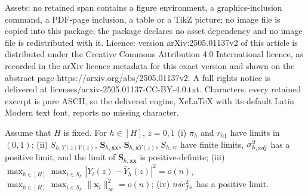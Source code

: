 \documentclass[10pt,a4paper]{amsart}
\newcommand{\adj}{\textnormal{adj}}
\newcommand{\bs}{\boldsymbol}
\newcommand{\fe}{\textnormal{fe}}
\newcommand{\ms}{\mathcal{S}}
\newcommand{\se}{\textnormal{se}}
\begin{document}
Assets: no retained span contains a figure environment, a graphics-inclusion command, a PDF-page inclusion, a table or a TikZ picture; no image file is copied into this package, the package declares no asset dependency and no image file is redistributed with it. Licence: version arXiv:2505.01137v2 of this article is distributed under the Creative Commons Attribution 4.0 International licence, as recorded in the arXiv licence metadata for this exact version and shown on the abstract page https://arxiv.org/abs/2505.01137v2. A full rights notice is delivered at licenses/arxiv-2505.01137-CC-BY-4.0.txt. Characters: every retained excerpt is pure ASCII, so the delivered engine, XeLaTeX with its default Latin Modern text font, reports no missing character.
\begin{condition}
\label{a:CLT-sre-for-rerandomization}
 Assume that $H$ is fixed. For $h \in [H]$, $z=0,1$ (i) $\pi_h$ and $r_{h1}$ have limits in $(0,1)$; (ii)  $S_{h,Y(z)Y(z)}$,  $\bs{S}_{h,\bs{x}\bs{x}}$, $\bs{S}_{h,\bs{x} Y(z)}$, $S_{h,\tau\tau}$ have finite limits, $\sigma^2_{h,\adj}$ has a positive limit, and the limit of $\bs{S}_{h,\bs{x}\bs{x}}$ is positive-definite; (iii) $\max_{h\in[H]}\max_{i\in \ms_h} |Y_i(z)-\bar{Y}_h(z)|^2 = o(n)$, $\max_{h\in[H]}\max_{i\in \ms_h} \lVert\bs{x}_i\lVert_{\infty}^2 = o(n)$; (iv) $n\tilde{\se}^2_{\fe }$ has a positive limit. 
\end{condition}
\end{document}
